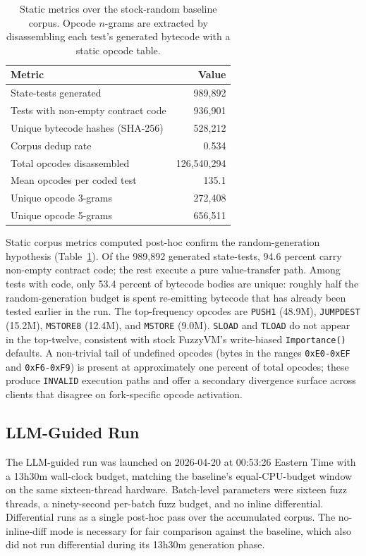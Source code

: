 \documentclass[conference]{IEEEtran}
\begin{document}
\begin{table}[t]
\centering
\caption{Static metrics over the stock-random baseline corpus. Opcode $n$-grams are extracted by disassembling each test's generated bytecode with a static opcode table.}
\label{tab:baseline_static}
\begin{tabular}{lr}
\hline
\textbf{Metric} & \textbf{Value} \\
\hline
State-tests generated & 989{,}892 \\
Tests with non-empty contract code & 936{,}901 \\
Unique bytecode hashes (SHA-256) & 528{,}212 \\
Corpus dedup rate & 0.534 \\
Total opcodes disassembled & 126{,}540{,}294 \\
Mean opcodes per coded test & 135.1 \\
Unique opcode 3-grams & 272{,}408 \\
Unique opcode 5-grams & 656{,}511 \\
\hline
\end{tabular}
\end{table}

Static corpus metrics computed post-hoc confirm the random-generation hypothesis (Table~\ref{tab:baseline_static}). Of the 989{,}892 generated state-tests, 94.6 percent carry non-empty contract code; the rest execute a pure value-transfer path. Among tests with code, only 53.4 percent of bytecode bodies are unique: roughly half the random-generation budget is spent re-emitting bytecode that has already been tested earlier in the run. The top-frequency opcodes are \texttt{PUSH1} (48.9M), \texttt{JUMPDEST} (15.2M), \texttt{MSTORE8} (12.4M), and \texttt{MSTORE} (9.0M). \texttt{SLOAD} and \texttt{TLOAD} do not appear in the top-twelve, consistent with stock FuzzyVM's write-biased \texttt{Importance()} defaults. A non-trivial tail of undefined opcodes (bytes in the ranges \texttt{0xE0-0xEF} and \texttt{0xF6-0xF9}) is present at approximately one percent of total opcodes; these produce \texttt{INVALID} execution paths and offer a secondary divergence surface across clients that disagree on fork-specific opcode activation.

\subsection{LLM-Guided Run}

The LLM-guided run was launched on 2026-04-20 at 00:53:26 Eastern Time with a 13h30m wall-clock budget, matching the baseline's equal-CPU-budget window on the same sixteen-thread hardware. Batch-level parameters were sixteen fuzz threads, a ninety-second per-batch fuzz budget, and no inline differential. Differential runs as a single post-hoc pass over the accumulated corpus. The no-inline-diff mode is necessary for fair comparison against the baseline, which also did not run differential during its 13h30m generation phase.
\end{document}
